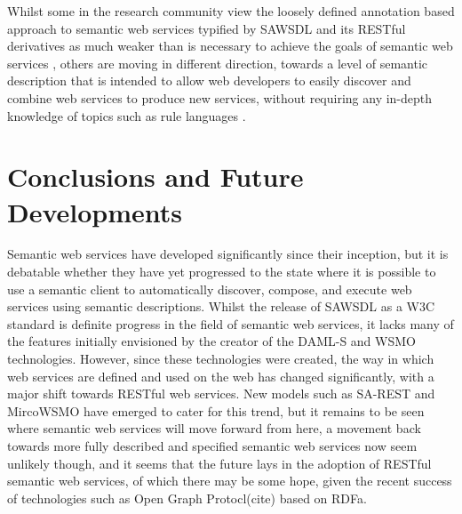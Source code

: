 Whilst some in the research community view the loosely defined annotation based approach
to semantic web services typified by SAWSDL and its RESTful derivatives as
much weaker than is necessary to achieve the goals of semantic web services
\cite{martin_bringing_2007}, others are moving in different direction, towards a
level of semantic description that is intended to allow web developers to easily discover
and combine web services to produce new services, without requiring any in-depth
knowledge of topics such as rule languages \cite{kopecky_hrests:_2008}\cite{lathem_sa-rest_2007}
\cite{sheth_semantics_2008}. 


\section{Conclusions and Future Developments}

Semantic web services have developed significantly since their inception, but it
is debatable whether they have yet progressed to the state where it is possible
to use a semantic client to automatically discover, compose, and execute web
services using semantic descriptions. Whilst the release of SAWSDL as a W3C
standard is definite progress in the field of semantic web services, it lacks
many of the features initially envisioned by the creator of the DAML-S and WSMO
technologies. However, since these technologies were created, the way in which
web services are defined and used on the web has changed significantly, with a
major shift towards RESTful web services. New models such as SA-REST and
MircoWSMO have emerged to cater for this trend, but it remains to be seen where
semantic web services will move forward from here, a movement back towards more
fully described and specified semantic web services now seem unlikely though,
and it seems that the future lays in the adoption of RESTful semantic web
services, of which there may be some hope, given the recent success of
technologies such as Open Graph Protocl(cite) based on RDFa.

